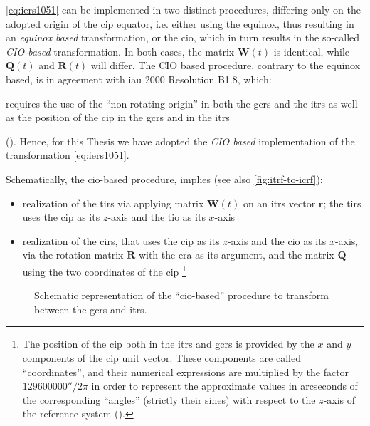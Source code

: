 \autoref{eq:iers1051} can be implemented in two distinct procedures, differing only on the 
adopted origin of the \gls{cip} equator, i.e. either using the equinox, thus resulting 
in an \emph{equinox based} transformation, or the \gls{cio}, which in turn results in 
the so-called \emph{CIO based} transformation. In both cases, the matrix $\bm{W}(t)$ is 
identical, while $\bm{Q}(t)$ and $\bm{R}(t)$ will differ. The CIO based
procedure, contrary to the equinox based, is in agreement with \gls{iau} 2000 Resolution B1.8, 
which:
\begin{displayquote}
requires the use of the ``non-rotating origin'' in both the \gls{gcrs} and the 
\gls{itrs} as well as the position of the \gls{cip} in the \gls{gcrs} and in the 
\gls{itrs} 
\end{displayquote}
(\cite{iers2010}). Hence, for this Thesis we have adopted the \emph{CIO based} 
implementation of the transformation \autoref{eq:iers1051}.

Schematically, the \gls{cio}-based procedure, implies (see also \autoref{fig:itrf-to-icrf}):
\begin{itemize}
    \item realization of the \gls{tirs} via applying matrix $\bm{W}(t)$ on an \gls{itrs} 
        vector $\bm{r}$; the \gls{tirs} uses the \gls{cip} as its $z$-axis and the 
        \gls{tio} as its $x$-axis
    \item realization of the \gls{cirs}, that uses the \gls{cip} as its $z$-axis and the 
        \gls{cio} as its $x$-axis, via the rotation matrix $\bm{R}$ with the \gls{era} 
        as its argument, and the matrix $\bm{Q}$ using the two coordinates of the \gls{cip}
        \footnote{The position of the \gls{cip} both in the \gls{itrs} and \gls{gcrs} is 
        provided by the $x$ and $y$ components of the \gls{cip} unit vector.
        These components are called ``coordinates'', and their numerical expressions 
        are multiplied by the factor $\ang{;;129600000}/2 \pi$ in order to represent the 
        approximate values in arcseconds of the corresponding ``angles'' (strictly 
        their sines) with respect to the $z$-axis of the reference system (\cite{iers2010}).}
\end{itemize}

\begin{figure}
  \centering
  
  \caption{Schematic representation of the ``\gls{cio}-based'' procedure to 
    transform between the \gls{gcrs} and \gls{itrs}.}
  \label{fig:itrf-to-icrf}
\end{figure}


